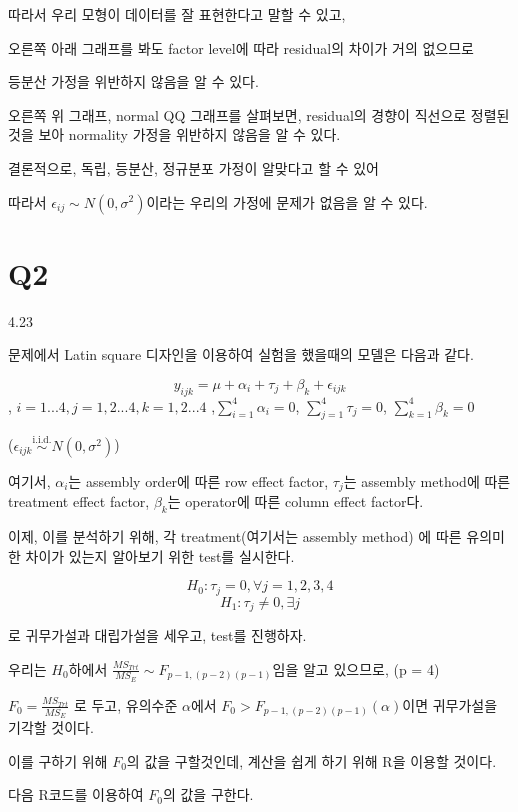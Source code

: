 \documentclass{article}
\begin{document}
따라서 우리 모형이 데이터를 잘 표현한다고 말할 수 있고,

오른쪽 아래 그래프를 봐도 factor level에 따라 residual의 차이가 거의 없으므로

등분산 가정을 위반하지 않음을 알 수 있다.

오른쪽 위 그래프, normal QQ 그래프를 살펴보면, residual의 경향이 직선으로 정렬된것을 보아 normality 가정을 위반하지 않음을 알 수 있다.

결론적으로, 독립, 등분산, 정규분포 가정이 알맞다고 할 수 있어

따라서 $\epsilon_{ij} \sim N(0,\sigma^2)$이라는 우리의 가정에 문제가 없음을 알 수 있다.


  





\section{Q2} 

4.23

문제에서 Latin square 디자인을 이용하여 실험을 했을때의 모델은 다음과 같다.

$$y_{ijk} = \mu + \alpha_i + \tau_j + \beta_k + \epsilon_{ijk} $$, $i = 1...4, j = 1, 2... 4, k = 1, 2... 4$ ,$\sum_{i=1}^4 \alpha_i = 0 $, $\sum_{j=1}^4 \tau_j = 0 $, $\sum_{k=1}^4 \beta_k = 0 $

($\epsilon_{ijk} \overset{\text{i.i.d.}}{\sim} N(0, \sigma^2)$)

여기서, $\alpha_i$는 assembly order에 따른 row effect factor, $\tau_j$는 assembly method에 따른 treatment effect factor,
$\beta_k$는 operator에 따른 column effect factor다.

이제, 이를 분석하기 위해, 각 treatment(여기서는 assembly method) 에 따른 유의미한 차이가 있는지 알아보기 위한 test를 실시한다.

$$H_0 : \tau_j = 0 , \forall j = 1, 2, 3, 4$$ 
$$H_1 :  \tau_j \neq 0, \exists j$$

로 귀무가설과 대립가설을 세우고, test를 진행하자.

우리는 $H_0$하에서 $\frac{MS_{Trt}}{MS_E} \sim F_{p-1, (p-2)(p-1)} $임을 알고 있으므로, (p = 4)

$F_0 = \frac{MS_{Trt}}{MS_E}$ 로 두고,  유의수준 $\alpha$에서 $F_0 > F_{p-1, (p-2)(p-1)}(\alpha)$이면 귀무가설을 기각할 것이다.

이를 구하기 위해 $F_0$의 값을 구할것인데, 계산을 쉽게 하기 위해 R을 이용할 것이다.

다음 R코드를 이용하여 $F_0$의 값을 구한다.
\end{document}
